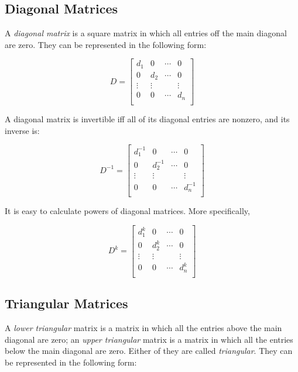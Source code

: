 \documentclass{report}
\begin{document}
		\subsection{Diagonal Matrices}
		A \emph{diagonal matrix} is a square matrix in which all entries off the main diagonal are zero. They can be represented in the following form:
		
		\begin{displaymath}
		D=
		\begin{bmatrix}
		d_1 & 0 & \cdots & 0 \\
		0 & d_2 & \cdots & 0 \\
		\vdots & \vdots &        & \vdots \\
		0 & 0 & \cdots & d_n \\
		\end{bmatrix}
		\end{displaymath}
		
		A diagonal matrix is invertible iff all of its diagonal entries are nonzero, and its inverse is:
		
		\begin{displaymath}
		D^{-1}=
		\begin{bmatrix}
		d_1^{-1} & 0 & \cdots & 0 \\
		0 & d_2^{-1} & \cdots & 0 \\
		\vdots & \vdots &        & \vdots \\
		0 & 0 & \cdots & d_n^{-1} \\
		\end{bmatrix}
		\end{displaymath}
		
		It is easy to calculate powers of diagonal matrices. More specifically,
		
		\begin{displaymath}
		D^{k}=
		\begin{bmatrix}
		d_1^{k} & 0 & \cdots & 0 \\
		0 & d_2^{k} & \cdots & 0 \\
		\vdots & \vdots &        & \vdots \\
		0 & 0 & \cdots & d_n^{k} \\
		\end{bmatrix}
		\end{displaymath}
		
		\subsection{Triangular Matrices}
		A \emph{lower triangular} matrix is a matrix in which all the entries above the main diagonal are zero; an \emph{upper triangular} matrix is a matrix in which all the entries below the main diagonal are zero. Either of they are called \emph{triangular}. They can be represented in the following form:
		
\end{document}
